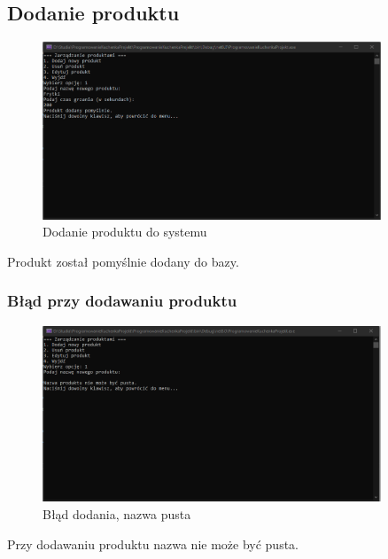 \subsection{Dodanie produktu}
\begin{figure}[h]
    \centering
    \includegraphics[width=0.9\textwidth]{Menu6.png}
      \caption{Dodanie produktu do systemu}
    \label{fig:example}
\end{figure}

Produkt został pomyślnie dodany do bazy.

\newpage
\subsubsection{Błąd przy dodawaniu produktu}
\begin{figure}[h]
    \centering
    \includegraphics[width=0.9\textwidth]{Menu7.png}
      \caption{Błąd dodania, nazwa pusta}
    \label{fig:example}
\end{figure}

Przy dodawaniu produktu nazwa nie może być pusta.

